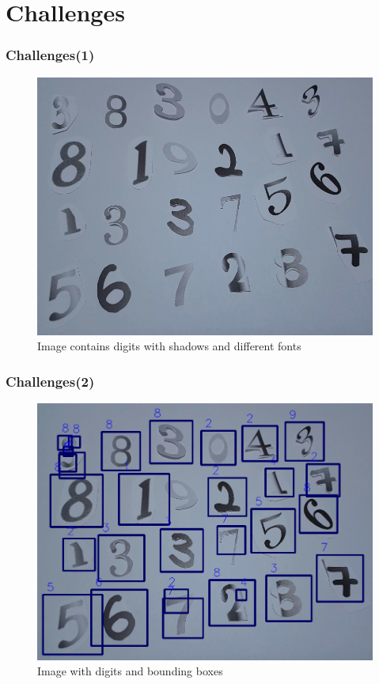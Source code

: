 \documentclass[11.5pt,aspectratio=1610,xcolor={usenames,dvipsnames,table}]{beamer}
\begin{document}
\section{Challenges}
\begin{frame}
\frametitle{Challenges(1)}


\begin{figure}[!h]
	\includegraphics[scale=0.3 ]{images/chalorig.png}
	\caption{Image contains digits with shadows and different fonts}
\end{figure}

\end{frame}




\begin{frame}
\frametitle{Challenges(2)}


\begin{figure}[!h]
	\includegraphics[scale=0.3 ]{images/chalbbox.png}
	\caption{Image with digits and bounding boxes}
\end{figure}

\end{frame}
\end{document}
